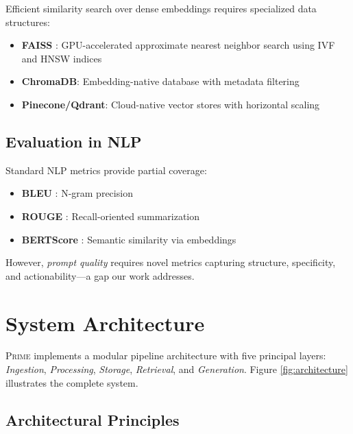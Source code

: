 \documentclass[11pt,a4paper]{article}
\newcommand{\primesys}{\textsc{Prime}}
\begin{document}
Efficient similarity search over dense embeddings requires specialized data structures:

\begin{itemize}
    \item \textbf{FAISS} \cite{johnson2019faiss}: GPU-accelerated approximate nearest neighbor search using IVF and HNSW indices
    \item \textbf{ChromaDB}: Embedding-native database with metadata filtering
    \item \textbf{Pinecone/Qdrant}: Cloud-native vector stores with horizontal scaling
\end{itemize}

\subsection{Evaluation in NLP}

Standard NLP metrics provide partial coverage:

\begin{itemize}
    \item \textbf{BLEU} \cite{papineni2002bleu}: N-gram precision
    \item \textbf{ROUGE} \cite{lin2004rouge}: Recall-oriented summarization
    \item \textbf{BERTScore} \cite{zhang2020bertscore}: Semantic similarity via embeddings
\end{itemize}

However, \textit{prompt quality} requires novel metrics capturing structure, specificity, and actionability—a gap our work addresses.

\section{System Architecture}
\label{sec:architecture}

\primesys{} implements a modular pipeline architecture with five principal layers: \textit{Ingestion}, \textit{Processing}, \textit{Storage}, \textit{Retrieval}, and \textit{Generation}. Figure \ref{fig:architecture} illustrates the complete system.

\subsection{Architectural Principles}
\end{document}

